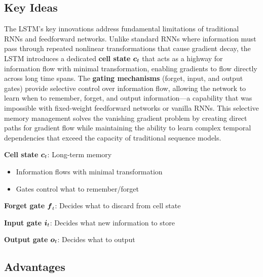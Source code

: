 \subsection{Key Ideas}

The LSTM's key innovations address fundamental limitations of traditional RNNs and feedforward networks. Unlike standard RNNs where information must pass through repeated nonlinear transformations that cause gradient decay, the LSTM introduces a dedicated \textbf{cell state} $\boldsymbol{c}_t$ that acts as a highway for information flow with minimal transformation, enabling gradients to flow directly across long time spans. The \textbf{gating mechanisms} (forget, input, and output gates) provide selective control over information flow, allowing the network to learn when to remember, forget, and output information—a capability that was impossible with fixed-weight feedforward networks or vanilla RNNs. This selective memory management solves the vanishing gradient problem by creating direct paths for gradient flow while maintaining the ability to learn complex temporal dependencies that exceed the capacity of traditional sequence models.

\textbf{Cell state} $\boldsymbol{c}_t$: Long-term memory
\begin{itemize}
    \item Information flows with minimal transformation
    \item Gates control what to remember/forget
\end{itemize}

\textbf{Forget gate} $\boldsymbol{f}_t$: Decides what to discard from cell state

\textbf{Input gate} $\boldsymbol{i}_t$: Decides what new information to store

\textbf{Output gate} $\boldsymbol{o}_t$: Decides what to output

\subsection{Advantages}

